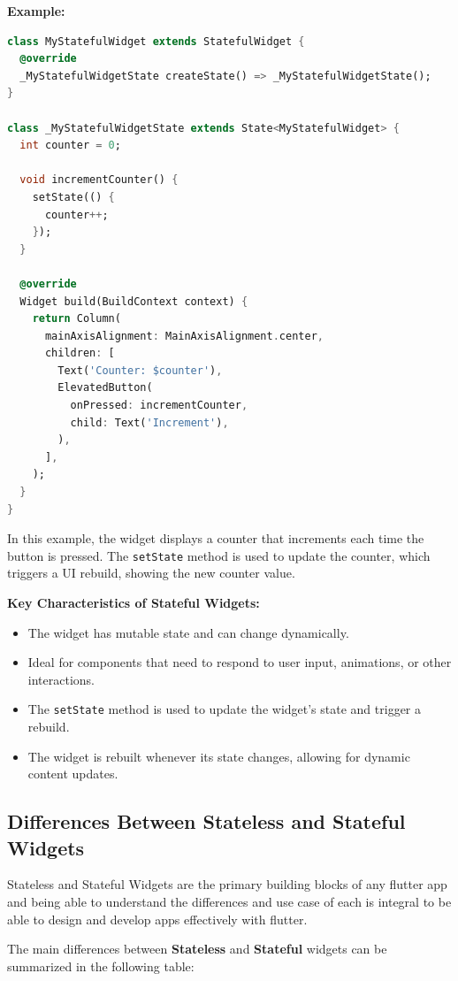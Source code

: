 \documentclass[12pt,a4paper]{report}
\begin{document}
\textbf{Example:}

\begin{lstlisting}[language=Dart, caption={Example of a Stateful Widget}]
class MyStatefulWidget extends StatefulWidget {
  @override
  _MyStatefulWidgetState createState() => _MyStatefulWidgetState();
}

class _MyStatefulWidgetState extends State<MyStatefulWidget> {
  int counter = 0;

  void incrementCounter() {
    setState(() {
      counter++;
    });
  }

  @override
  Widget build(BuildContext context) {
    return Column(
      mainAxisAlignment: MainAxisAlignment.center,
      children: [
        Text('Counter: $counter'),
        ElevatedButton(
          onPressed: incrementCounter,
          child: Text('Increment'),
        ),
      ],
    );
  }
}
\end{lstlisting}

In this example, the widget displays a counter that increments each time the button is pressed. The \texttt{setState} method is used to update the counter, which triggers a UI rebuild, showing the new counter value.

\textbf{Key Characteristics of Stateful Widgets:}
\begin{itemize}
    \item The widget has mutable state and can change dynamically.
    \item Ideal for components that need to respond to user input, animations, or other interactions.
    \item The \texttt{setState} method is used to update the widget's state and trigger a rebuild.
    \item The widget is rebuilt whenever its state changes, allowing for dynamic content updates.
\end{itemize}

\subsection{Differences Between Stateless and Stateful Widgets}
Stateless and Stateful Widgets are the primary building blocks of any flutter app and being able to understand the differences and use case of each is integral to be able to design and develop apps effectively with flutter.

The main differences between \textbf{Stateless} and \textbf{Stateful} widgets can be summarized in the following table:
\end{document}
